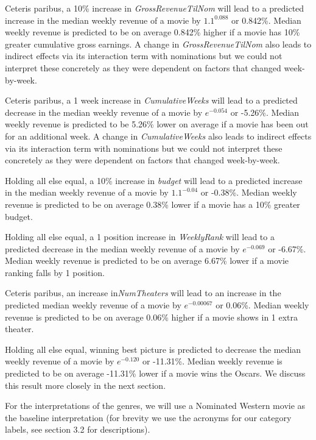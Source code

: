 \documentclass[10.7pt]{article} %
\begin{document}
Ceteris paribus, a 10\% increase in \textit{GrossRevenueTilNom} will lead to a predicted increase in the median weekly revenue of a movie by $1.1^{0.088}$ or 0.842\%. Median weekly revenue is predicted to be on average 0.842\% higher if a movie has 10\% greater cumulative gross earnings. A change in \textit{GrossRevenueTilNom} also leads to indirect effects via its interaction term with nominations but we could not interpret these concretely as they were dependent on factors that changed week-by-week.

Ceteris paribus, a 1 week increase in \textit{CumulativeWeeks} will lead to a predicted decrease in the median weekly revenue of a movie by $e^{-0.054}$ or -5.26\%.  Median weekly revenue is predicted to be 5.26\% lower on average if a movie has been out for an additional week. A change in \textit{CumulativeWeeks} also leads to indirect effects via its interaction term with nominations but we could not interpret these concretely as they were dependent on factors that changed week-by-week.

Holding all else equal, a 10\% increase in \textit{budget} will lead to a predicted increase in the median weekly revenue of a movie by $1.1^{-0.04}$ or -0.38\%.  Median weekly revenue is predicted to be on average 0.38\% lower if a movie has a 10\% greater budget.

Holding all else equal, a 1 position increase in \textit{WeeklyRank} will lead to a predicted decrease in the median weekly revenue of a movie by $e^{-0.069}$ or -6.67\%.  Median weekly revenue is predicted to be on average 6.67\% lower if a movie ranking falls by 1 position.

Ceteris paribus, an increase in\textit{NumTheaters} will lead to an increase in the predicted median weekly revenue of a movie by $e^{-0.00067}$ or 0.06\%.  Median weekly revenue is predicted to be on average 0.06\% higher if a movie shows in 1 extra theater.

Holding all else equal, winning best picture is predicted to decrease the median weekly revenue of a movie by $e^{-0.120}$ or -11.31\%. Median weekly revenue is predicted to be on average -11.31\% lower if a movie wins the Oscars. We discuss this result more closely in the next section.

\vspace{\baselineskip} 

For the interpretations of the genres, we will use a Nominated Western movie as the baseline interpretation (for brevity we use the acronyms for our category labels, see section 3.2 for descriptions).
\end{document}
